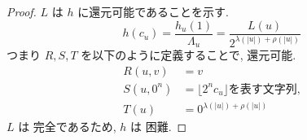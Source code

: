 \begin{proof}
 $L$ は $h$ に還元可能であることを示す.
 \begin{equation}
  h(c_u) = \frac{h_u(1)}{\Lambda_u}
   = \frac{L(u)}{2^{\lambda(|u|)+\rho(|u|)}}
 \end{equation}
 つまり $R,S,T$ を以下のように定義することで, 還元可能.
 \begin{align}
  R(u,v) &= v \\
  S(u, 0^n) &= \lfloor 2^nc_u \rfloor \text{を表す文字列,} \\
  T(u) &= 0^{\lambda(|u|)+\rho(|u|)}
 \end{align}
 $L$ は \PSPACE 完全であるため, $h$ は \PSPACE 困難.
\end{proof}
\fi

